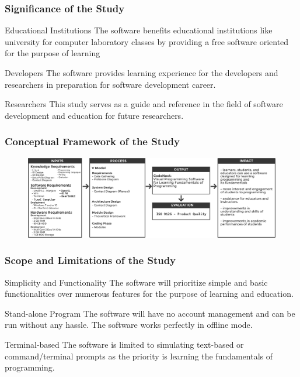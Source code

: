 \documentclass[handout]{beamer}
\begin{document}
\begin{frame}
	\frametitle{Significance of the Study}
	\begin{block}{Educational Institutions}
		The software benefits educational institutions like university for computer
		laboratory classes by providing a free software oriented for the purpose of
		learning
	\end{block}

	\begin{block}{Developers}
		The software provides learning experience for the developers and researchers
		in preparation for software development career.
	\end{block}

	\begin{block}{Researchers}
		This study serves as a guide and reference in the field of software
		development and education for future researchers.
	\end{block}
\end{frame}

\begin{frame}
	\frametitle{Conceptual Framework of the Study}
	\begin{figure}
		\includegraphics[width=1\textwidth]{figures/conceptual_framework.png}
	\end{figure}
\end{frame}

\begin{frame}
	\frametitle{Scope and Limitations of the Study}
	\begin{block}{Simplicity and Functionality}
		The software will prioritize simple and basic functionalities over numerous
		features for the purpose of learning and education.
	\end{block}
	\begin{block}{Stand-alone Program}
		The software will have no account management and can be run without any
		hassle. The software works perfectly in offline mode.
	\end{block}
	\begin{block}{Terminal-based}
		The software is limited to simulating text-based or command/terminal
		prompts as the priority is learning the fundamentals of programming.
	\end{block}
\end{frame}
\end{document}
